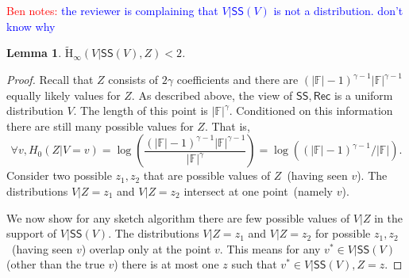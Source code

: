 \documentclass[11pt]{article}
\newcommand{\class}[1]{{\ensuremath{\mathsf{#1}}}}
\newcommand{\sketch}{\ensuremath{\class{SS}}\xspace}
\newcommand{\rec}{\ensuremath{\class{Rec}}\xspace}
\newcommand{\Hav}{\tilde{\mathrm{H}}_\infty}
\newtheorem{lemma}[theorem]{Lemma}
\newcommand{\authnote}[2]{{\textcolor{red}{\textsf{#1 notes: }\textcolor{blue}{ #2}}\marginpar{\textcolor{red}{\textbf{!!!!!}}}}}
\newcommand{\authnote}[2]{}
\newcommand{\bnote}[1]{{\authnote{Ben}{#1}}}
\begin{document}
\bnote{the reviewer is complaining that $V | \sketch(V)$ is not a distribution.  don't know why}
\begin{lemma}
\label{lem:side info determines sketch}
$\Hav(V | \sketch(V), Z) <2$.
\end{lemma}
\begin{proof}
Recall that $Z$ consists of $2\gamma$ coefficients and there are $(|\mathbb{F}|-1)^{\gamma-1} |\mathbb{F}|^{\gamma-1}$ equally likely values for $Z$.
 As described above, the view of $\sketch, \rec$ is a uniform distribution $V$. 
The length of this point is $|\mathbb{F}|^\gamma$.  Conditioned on this information there are still many possible values for $Z$.  That is, 
 \[
 \forall v, H_0(Z | V=v) =\log \left(\frac{(|\mathbb{F}|-1)^{\gamma-1} |\mathbb{F}|^{\gamma-1}}{|\mathbb{F}|^\gamma}\right) = \log \left( (|\mathbb{F}|-1)^{\gamma-1}/|\mathbb{F}|\right).
 \]
Consider two possible $z_1, z_2$ that are possible values of $Z$~(having seen $v$).  The distributions $V| Z=z_1$ and $V | Z=z_2$ intersect at one point~(namely $v$).  

We now show for any sketch algorithm there are few possible values of $V|Z$ in the support of $V |\sketch(V)$.  The distributions $V | Z=z_1$ and $V| Z=z_2$ for possible $z_1, z_2$~(having seen $v$) overlap only at the point $v$.  This means for any $v^*\in V| \sketch(V)$ (other than the true $v$) there is at most one $z$ such that $v^*\in V | \sketch(V), Z=z$.  


\end{proof}
\end{document}
